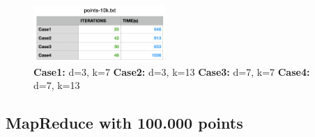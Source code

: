 \documentclass{book}
\begin{document}
    \begin{figure}[H]
        \hfill
        \hfill
        \hfill
        \includegraphics[width=5cm]{hadoop/tabella_point10k}
        \centering
        \caption{\footnotesize{\textbf{Case1:} d=3, k=7 \textbf{Case2:} d=3, k=13 \textbf{Case3:} d=7, k=7 \textbf{Case4:} d=7, k=13}}
    \end{figure}

    \subsection{MapReduce with 100.000 points}
    \paragraph{}
\end{document}
